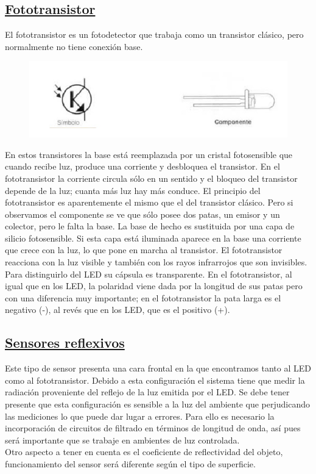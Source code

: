 \documentclass[a4paper,11pt]{article}
\begin{document}
\subsection{\underline{Fototransistor}}
El fototransistor es un fotodetector que trabaja como un transistor clásico, pero normalmente no tiene conexión base.
	\begin{figure}[h]
	\centering
	\includegraphics{./2}
	\end{figure}

En estos transistores la base está reemplazada por un cristal fotosensible que cuando recibe luz, produce una corriente y desbloquea el transistor. En el fototransistor la corriente circula sólo en un sentido y el bloqueo del transistor depende de la luz; cuanta más luz hay más conduce. El principio del fototransistor es aparentemente el mismo que el del transistor clásico. Pero si observamos el componente se ve que sólo posee dos patas, un emisor y un colector, pero le falta la base. La base de hecho es sustituida por una capa de silicio fotosensible. Si esta capa está iluminada aparece en la base una corriente que crece con la luz, lo que pone en marcha al transistor. El fototransistor reacciona con la luz visible y también con los rayos infrarrojos que son invisibles. Para distinguirlo del LED su cápsula es transparente. En el fototransistor, al igual que en los LED, la polaridad viene dada por la longitud de sus patas pero con una diferencia muy importante; en el fototransistor la pata larga es el negativo (-), al revés que en los LED, que es el positivo (+).

\subsection{\underline{Sensores reflexivos}}
Este tipo de sensor presenta una cara frontal en la que encontramos tanto al LED como al fototransistor. Debido a esta configuración el sistema tiene que medir la radiación proveniente del reflejo de la luz emitida por el LED. 
Se debe tener presente que esta configuración es sensible a la luz del ambiente que perjudicando las mediciones lo que puede dar lugar a errores. Para ello es necesario la incorporación de circuitos de filtrado en términos de longitud de onda, así pues será importante que se trabaje en ambientes de luz controlada. \\
                                                                                                                        Otro aspecto a tener en cuenta es el coeficiente de reflectividad del objeto, funcionamiento del sensor será diferente según el tipo de superficie.
\end{document}
